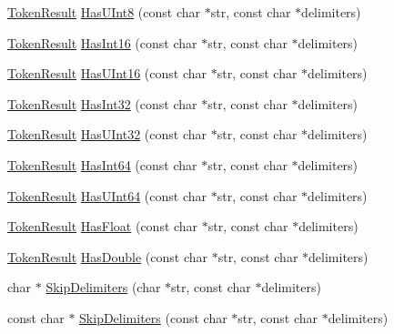\begin{DoxyCompactItemize}
\item 
\hyperlink{namespacemage_a2178ba2411db5912f41b2e7698c2037d}{Token\+Result} \hyperlink{namespacemage_ad4371436b14bc05f22abde780bf07be5}{Has\+U\+Int8} (const char $\ast$str, const char $\ast$delimiters)
\item 
\hyperlink{namespacemage_a2178ba2411db5912f41b2e7698c2037d}{Token\+Result} \hyperlink{namespacemage_acb619a437a47ef3212c2fc71fdfa33b6}{Has\+Int16} (const char $\ast$str, const char $\ast$delimiters)
\item 
\hyperlink{namespacemage_a2178ba2411db5912f41b2e7698c2037d}{Token\+Result} \hyperlink{namespacemage_a1dd9c4b40b7b0e084a3014f8fd9f26ca}{Has\+U\+Int16} (const char $\ast$str, const char $\ast$delimiters)
\item 
\hyperlink{namespacemage_a2178ba2411db5912f41b2e7698c2037d}{Token\+Result} \hyperlink{namespacemage_a78f76aec12a47505136e00224e4bf9ce}{Has\+Int32} (const char $\ast$str, const char $\ast$delimiters)
\item 
\hyperlink{namespacemage_a2178ba2411db5912f41b2e7698c2037d}{Token\+Result} \hyperlink{namespacemage_a2b7625293b098b935d6fe3b251573018}{Has\+U\+Int32} (const char $\ast$str, const char $\ast$delimiters)
\item 
\hyperlink{namespacemage_a2178ba2411db5912f41b2e7698c2037d}{Token\+Result} \hyperlink{namespacemage_a59d8d6302b2f0cd017dfa2217ac536b0}{Has\+Int64} (const char $\ast$str, const char $\ast$delimiters)
\item 
\hyperlink{namespacemage_a2178ba2411db5912f41b2e7698c2037d}{Token\+Result} \hyperlink{namespacemage_a49b54d6a4244d71dc63237ead3a6307e}{Has\+U\+Int64} (const char $\ast$str, const char $\ast$delimiters)
\item 
\hyperlink{namespacemage_a2178ba2411db5912f41b2e7698c2037d}{Token\+Result} \hyperlink{namespacemage_a8ebb1c7757b2869a4d3dc3c60c3a836d}{Has\+Float} (const char $\ast$str, const char $\ast$delimiters)
\item 
\hyperlink{namespacemage_a2178ba2411db5912f41b2e7698c2037d}{Token\+Result} \hyperlink{namespacemage_ac039d6b5a481b26e7440672a75ad70df}{Has\+Double} (const char $\ast$str, const char $\ast$delimiters)
\item 
char $\ast$ \hyperlink{namespacemage_a0a49375006b3808200d86271f62dbbc2}{Skip\+Delimiters} (char $\ast$str, const char $\ast$delimiters)
\item 
const char $\ast$ \hyperlink{namespacemage_acd903800f144d88982aa559730b9a165}{Skip\+Delimiters} (const char $\ast$str, const char $\ast$delimiters)

\end{DoxyCompactItemize}
